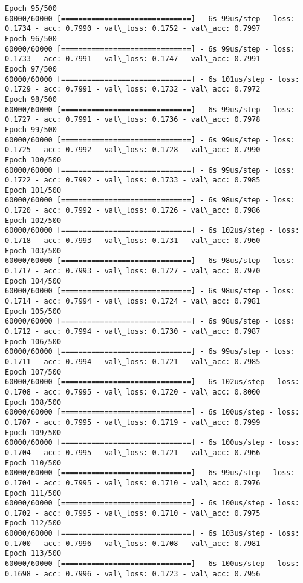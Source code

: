 \documentclass[11pt]{article}
\begin{document}
\begin{Verbatim}[commandchars=\\\{\}]
Epoch 95/500
60000/60000 [==============================] - 6s 99us/step - loss: 0.1734 - acc: 0.7990 - val\_loss: 0.1752 - val\_acc: 0.7997
Epoch 96/500
60000/60000 [==============================] - 6s 99us/step - loss: 0.1733 - acc: 0.7991 - val\_loss: 0.1747 - val\_acc: 0.7991
Epoch 97/500
60000/60000 [==============================] - 6s 101us/step - loss: 0.1729 - acc: 0.7991 - val\_loss: 0.1732 - val\_acc: 0.7972
Epoch 98/500
60000/60000 [==============================] - 6s 99us/step - loss: 0.1727 - acc: 0.7991 - val\_loss: 0.1736 - val\_acc: 0.7978
Epoch 99/500
60000/60000 [==============================] - 6s 99us/step - loss: 0.1725 - acc: 0.7992 - val\_loss: 0.1728 - val\_acc: 0.7990
Epoch 100/500
60000/60000 [==============================] - 6s 99us/step - loss: 0.1722 - acc: 0.7992 - val\_loss: 0.1733 - val\_acc: 0.7985
Epoch 101/500
60000/60000 [==============================] - 6s 98us/step - loss: 0.1720 - acc: 0.7992 - val\_loss: 0.1726 - val\_acc: 0.7986
Epoch 102/500
60000/60000 [==============================] - 6s 102us/step - loss: 0.1718 - acc: 0.7993 - val\_loss: 0.1731 - val\_acc: 0.7960
Epoch 103/500
60000/60000 [==============================] - 6s 98us/step - loss: 0.1717 - acc: 0.7993 - val\_loss: 0.1727 - val\_acc: 0.7970
Epoch 104/500
60000/60000 [==============================] - 6s 98us/step - loss: 0.1714 - acc: 0.7994 - val\_loss: 0.1724 - val\_acc: 0.7981
Epoch 105/500
60000/60000 [==============================] - 6s 98us/step - loss: 0.1712 - acc: 0.7994 - val\_loss: 0.1730 - val\_acc: 0.7987
Epoch 106/500
60000/60000 [==============================] - 6s 99us/step - loss: 0.1711 - acc: 0.7994 - val\_loss: 0.1721 - val\_acc: 0.7985
Epoch 107/500
60000/60000 [==============================] - 6s 102us/step - loss: 0.1708 - acc: 0.7995 - val\_loss: 0.1720 - val\_acc: 0.8000
Epoch 108/500
60000/60000 [==============================] - 6s 100us/step - loss: 0.1707 - acc: 0.7995 - val\_loss: 0.1719 - val\_acc: 0.7999
Epoch 109/500
60000/60000 [==============================] - 6s 100us/step - loss: 0.1704 - acc: 0.7995 - val\_loss: 0.1721 - val\_acc: 0.7966
Epoch 110/500
60000/60000 [==============================] - 6s 99us/step - loss: 0.1704 - acc: 0.7995 - val\_loss: 0.1710 - val\_acc: 0.7976
Epoch 111/500
60000/60000 [==============================] - 6s 100us/step - loss: 0.1702 - acc: 0.7995 - val\_loss: 0.1710 - val\_acc: 0.7975
Epoch 112/500
60000/60000 [==============================] - 6s 103us/step - loss: 0.1700 - acc: 0.7996 - val\_loss: 0.1708 - val\_acc: 0.7981
Epoch 113/500
60000/60000 [==============================] - 6s 100us/step - loss: 0.1698 - acc: 0.7996 - val\_loss: 0.1723 - val\_acc: 0.7956

\end{Verbatim}
\end{document}
